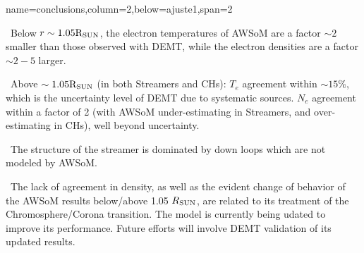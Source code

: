 \documentclass[paperwidth=100cm,paperheight=120cm]{baposter_2}
\def\bu{\textcolor{red}{\textbullet~}}
\def\bu{\textcolor{red}{\textbullet~}}
\begin{document}
\begin{poster}
{{}
}

{name=conclusions,column=2,below=ajuste1,span=2}{
{\footnotesize\sf
\bu Below $r \sim 1.05 {\rm R_{SUN}}$, the electron temperatures of AWSoM are a factor $\sim 2$ smaller than those observed with DEMT, while the electron densities are a factor $\sim 2-5$ larger.

\bu Above $\sim 1.05 {\rm R_{SUN}}$ (in both Streamers and CHs): $T_e$ agreement within $\sim 15 \%$, which is the uncertainty level of DEMT due to systematic sources. $N_e$ agreement within a factor of 2 (with AWSoM under-estimating in Streamers, and over-estimating in CHs), well beyond uncertainty.

\bu The structure of the streamer is dominated by down loops which are not modeled by AWSoM.

\bu The lack of agreement in density, as well as the evident change of behavior of the AWSoM results below/above 1.05 $R_{\rm SUN}$, are related to its treatment of the Chromosphere/Corona transition. The model is currently being udated to improve its performance. Future efforts will involve DEMT validation of its updated results.

}
}

\end{poster}%
\end{document}
